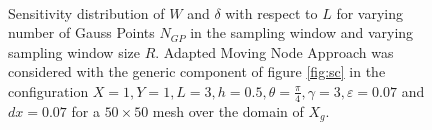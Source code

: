 \begin{figure}[ht]
\centering
{}%
     \\
    \caption{Sensitivity distribution of $W$ and $\delta$ with respect to $L$ for varying number of Gauss Points $N_{GP}$ in the sampling window and varying sampling window size $R$. Adapted Moving Node Approach was considered with the generic component of figure \ref{fig:sc} in the configuration  $X=1,Y=1,L=3,h=0.5,\theta=\frac{\pi}{4}, \gamma=3, \varepsilon=0.07$ and  $dx=0.07$ for a $50\times50$ mesh over the domain of $X_g$.}%
    \label{fig:sensL}%
\end{figure}
